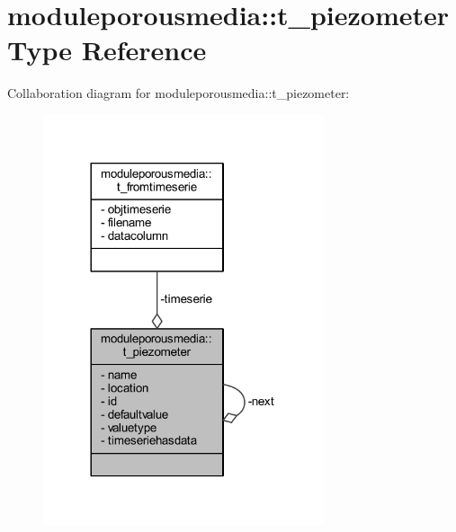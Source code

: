 \hypertarget{structmoduleporousmedia_1_1t__piezometer}{}\section{moduleporousmedia\+:\+:t\+\_\+piezometer Type Reference}
\label{structmoduleporousmedia_1_1t__piezometer}


Collaboration diagram for moduleporousmedia\+:\+:t\+\_\+piezometer\+:\nopagebreak
\begin{figure}[H]
\begin{center}
\leavevmode
\includegraphics[width=233pt]{structmoduleporousmedia_1_1t__piezometer__coll__graph}
\end{center}
\end{figure}
